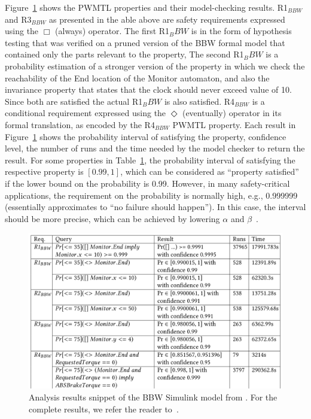 Figure~\ref{fig_smcresult} shows the PWMTL properties and their model-checking results. R1$_{BBW}$ and R3$_{BBW}$ as presented in the able above  are safety requirements expressed using the $\Box$ (always) operator. The first R1$_BBW$ is in the form of hypothesis testing that was verified on a pruned version of the  BBW formal model that contained only the parts relevant to the property, The second R1$_BBW$ is a probability estimation of a stronger version of the property in which we check the reachability of the End location of the Monitor automaton, and also the invariance property that states that the clock should never exceed value of 10. Since both are satisfied the actual R1$_BBW$ is also satisfied.  R4$_{BBW}$ is a conditional requirement expressed using the $\Diamond$ (eventually) operator in its formal translation, as encoded by the R4$_{BBW}$ PWMTL property. Each result in Figure~\ref{fig_smcresult} shows the probability interval of satisfying the property, confidence level, the number of runs and the time needed by the model checker to return the result. For some properties in Table~\ref{fig_smcresult}, the probability interval of satisfying the respective property is $[0.99, 1]$, which can be considered as ``property satisfied'' if the lower bound on the probability is 0.99. However, in many safety-critical applications, the requirement on the probability is normally high, e.g., 0.999999 (essentially approximates to ``no failure should happen''). In this case, the interval should be more precise, which can be achieved by lowering $\alpha$ and $\beta$~\cite{David2011StatisticalAutomata}.
\begin{figure}
	\centering
	\includegraphics[width=1\linewidth]{images/smc_result}
	\caption{Analysis results snippet of the BBW Simulink model from \uppaalsmc{}. For the complete results, we refer the reader to~\cite{Filipovikj2018SimppaalModels}.}
	\label{fig_smcresult}\vspace{-0.2cm}
\end{figure}

